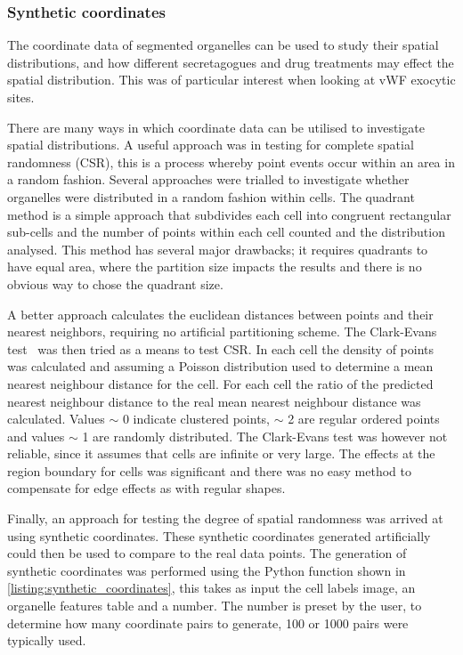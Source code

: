 \subsubsection{Synthetic coordinates}
\label{endothelial_morphometry:image_processing:synthetic_coordinates}
The coordinate data of segmented organelles can be used to study their spatial distributions, and how different secretagogues and drug treatments may effect the spatial distribution. This was of particular interest when looking at vWF exocytic sites.

There are many ways in which coordinate data can be utilised to investigate spatial distributions. A useful approach was in testing for complete spatial randomness (CSR), this is a process whereby point events occur within an area in a random fashion. Several approaches were trialled to investigate whether organelles were distributed in a random fashion within cells. The quadrant method is a simple approach that subdivides each cell into congruent rectangular sub-cells and the number of points within each cell counted and the distribution analysed. This method has several major drawbacks; it requires quadrants to have equal area, where the partition size impacts the results and there is no obvious way to chose the quadrant size.

A better approach calculates the euclidean distances between points and their nearest neighbors, requiring no artificial partitioning scheme. The Clark-Evans test~\cite{Clark1954} was then tried as a means to test CSR. In each cell the density of points was calculated and assuming a Poisson distribution used to determine a mean nearest neighbour distance for the cell. For each cell the ratio of the predicted nearest neighbour distance to the real mean nearest neighbour distance was calculated. Values $\sim$ 0 indicate clustered points, $\sim$ 2 are regular ordered points and values $\sim$ 1 are randomly distributed. The Clark-Evans test was however not reliable, since it assumes that cells are infinite or very large. The effects at the region boundary for cells was significant and there was no easy method to compensate for edge effects as with regular shapes.

Finally, an approach for testing the degree of spatial randomness was arrived at using synthetic coordinates. These synthetic coordinates generated artificially could then be used to compare to the real data points. The generation of synthetic coordinates was performed using the Python function shown in \autoref{listing:synthetic_coordinates}, this takes as input the cell labels image, an organelle features table and a number. The number is preset by the user, to determine how many coordinate pairs to generate, 100 or 1000 pairs were typically used.

